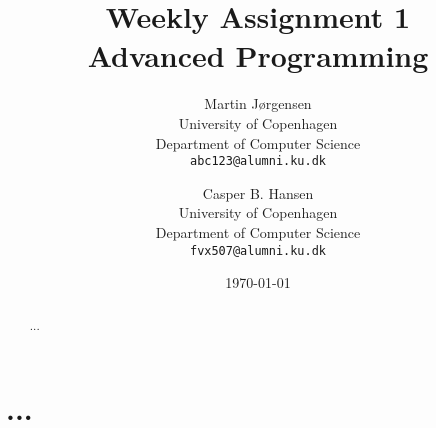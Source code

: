 \documentclass[11pt]{article}
\title
{
    {\Large Weekly Assignment 1} \\
    Advanced Programming
}
\author
{
    Martin Jørgensen \\
    University of Copenhagen \\
    Department of Computer Science \\
    {\tt abc123@alumni.ku.dk}
    \and
    Casper B. Hansen \\
    University of Copenhagen \\
    Department of Computer Science \\
    {\tt fvx507@alumni.ku.dk}
}
\date{\today}
\begin{document}
\maketitle
\thispagestyle{empty}
\begin{multicols}{2}
    \begin{abstract}
        ...
    \end{abstract}
\vfill\columnbreak
\tableofcontents
\end{multicols}

\clearpage


\section{...}
\end{document}
